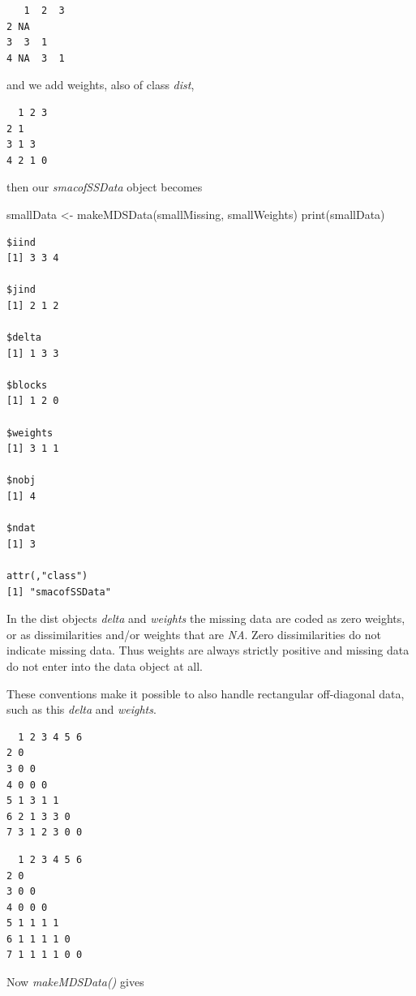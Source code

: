 \documentclass[
  12pt,
  letterpaper,
  DIV=11,
  numbers=noendperiod]{scrartcl}
\newenvironment{Shaded}{\begin{snugshade}}{\end{snugshade}}
\newcommand{\FunctionTok}[1]{\textcolor[rgb]{0.28,0.35,0.67}{#1}}
\newcommand{\NormalTok}[1]{\textcolor[rgb]{0.00,0.23,0.31}{#1}}
\newcommand{\OtherTok}[1]{\textcolor[rgb]{0.00,0.23,0.31}{#1}}
\begin{document}
\begin{verbatim}
   1  2  3
2 NA      
3  3  1   
4 NA  3  1
\end{verbatim}

and we add weights, also of class \emph{dist},

\begin{verbatim}
  1 2 3
2 1    
3 1 3  
4 2 1 0
\end{verbatim}

then our \emph{smacofSSData} object becomes

\begin{Shaded}
\begin{Highlighting}[]
\NormalTok{smallData }\OtherTok{\textless{}{-}} \FunctionTok{makeMDSData}\NormalTok{(smallMissing, smallWeights)}
\FunctionTok{print}\NormalTok{(smallData)}
\end{Highlighting}
\end{Shaded}

\begin{verbatim}
$iind
[1] 3 3 4

$jind
[1] 2 1 2

$delta
[1] 1 3 3

$blocks
[1] 1 2 0

$weights
[1] 3 1 1

$nobj
[1] 4

$ndat
[1] 3

attr(,"class")
[1] "smacofSSData"
\end{verbatim}

In the dist objects \emph{delta} and \emph{weights} the missing data are
coded as zero weights, or as dissimilarities and/or weights that are
\emph{NA}. Zero dissimilarities do not indicate missing data. Thus
weights are always strictly positive and missing data do not enter into
the data object at all.

These conventions make it possible to also handle rectangular
off-diagonal data, such as this \emph{delta} and \emph{weights}.

\begin{verbatim}
  1 2 3 4 5 6
2 0          
3 0 0        
4 0 0 0      
5 1 3 1 1    
6 2 1 3 3 0  
7 3 1 2 3 0 0
\end{verbatim}

\begin{verbatim}
  1 2 3 4 5 6
2 0          
3 0 0        
4 0 0 0      
5 1 1 1 1    
6 1 1 1 1 0  
7 1 1 1 1 0 0
\end{verbatim}

Now \emph{makeMDSData()} gives
\end{document}
